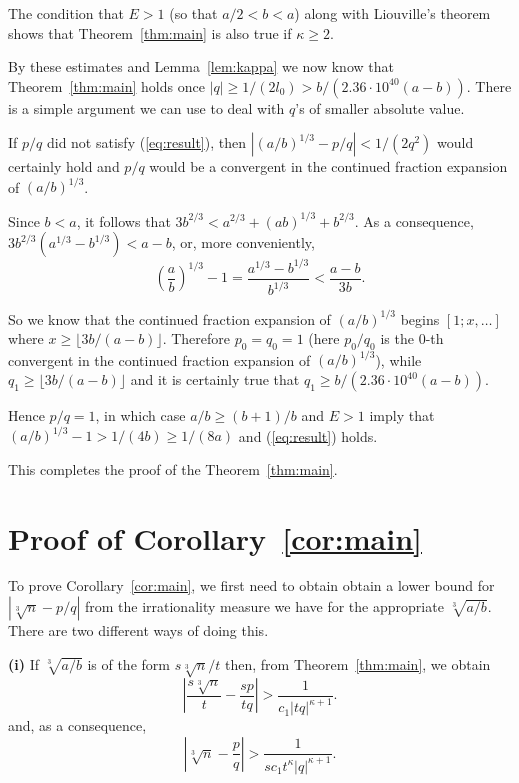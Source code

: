 \documentclass{jT}
\theoremstyle{definition}
\begin{document}
The condition that $E > 1$ (so that $a/2 < b < a$) along with Liouville's
theorem shows that Theorem~\ref{thm:main} is also true if $\kappa \geq 2$. 

By these estimates and Lemma~\ref{lem:kappa} we now know that
Theorem~\ref{thm:main} holds once $|q| \geq 1/(2l_{0}) 
> b/ \left( 2.36 \cdot 10^{40} (a-b) \right)$. There is 
a simple argument we can use to deal with $q$'s of 
smaller absolute value.

If $p/q$ did not satisfy (\ref{eq:result}), then 
$\left| (a/b)^{1/3}-p/q \right| < 1/ \left( 2q^{2} \right)$ 
would certainly hold and $p/q$ would be a convergent in the
continued fraction expansion of $(a/b)^{1/3}$.

Since $b < a$, it follows that $3b^{2/3} < a^{2/3}+(ab)^{1/3}+b^{2/3}$. As a consequence,
$3b^{2/3}\left( a^{1/3} - b^{1/3} \right) < a-b$, or, more conveniently, 
\begin{displaymath}
{ \left( \frac{a}{b} \right) }^{1/3} - 1
= \frac{a^{1/3} - b^{1/3}}{b^{1/3}}  
< \frac{a-b}{3b}. 
\end{displaymath}

So we know that the continued fraction expansion of $(a/b)^{1/3}$ begins
$[1;x, \ldots]$ where $x \geq \lfloor 3b/(a-b) \rfloor$. Therefore $p_{0}=q_{0}=1$
(here $p_{0}/q_{0}$ is the 0-th convergent in the continued fraction expansion
of $(a/b)^{1/3}$), while $q_{1} \geq \lfloor 3b/(a-b) \rfloor$ and it is certainly true
that $q_{1} \geq b/(2.36 \cdot 10^{40}(a-b))$. 

Hence $p/q=1$, in which case $a/b \geq (b+1)/b$ and $E > 1$ imply that
$(a/b)^{1/3}-1 > 1/(4b) \geq 1/(8a)$ and (\ref{eq:result}) holds.

This completes the proof of the Theorem~\ref{thm:main}. 

\section{Proof of Corollary~\ref{cor:main}}

To prove Corollary~\ref{cor:main}, we first need to obtain obtain a
lower bound for $|\sqrt[3]{n} - p/q|$ from the irrationality measure
we have for the appropriate $\sqrt[3]{a/b}$. There are two different 
ways of doing this. 

{\bf (i)} If $\sqrt[3]{a/b}$ is of the form $s \sqrt[3]{n}/t$ then, from  
Theorem~\ref{thm:main}, we obtain 
\begin{displaymath}
\left| \frac{s \sqrt[3]{n}}{t} - \frac{sp}{tq} \right| 
> \frac{1}{c_{1} |tq|^{\kappa+1}}. 
\end{displaymath}
and, as a consequence,  
\begin{displaymath}
\left| \sqrt[3]{n} - \frac{p}{q} \right| 
> \frac{1}{sc_{1} t^{\kappa} |q|^{\kappa+1}}. 
\end{displaymath}
\end{document}
